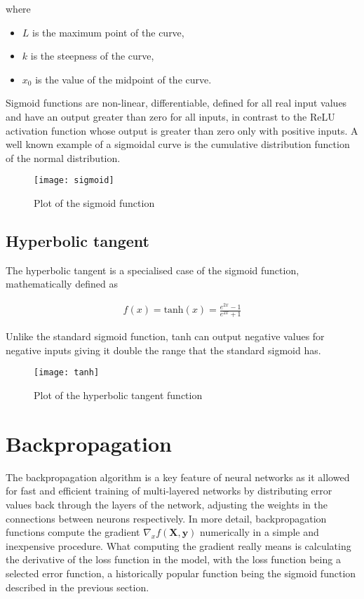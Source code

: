 where 
\begin{itemize}[nosep]
    \item[] $L$ is the maximum point of the curve,
    \item[] $k$ is the steepness of the curve,
    \item[] $x_0$ is the value of the midpoint of the curve. 
\end{itemize}

Sigmoid functions are non-linear, differentiable, defined for all real input values and have an output greater than zero for all inputs, in contrast to the ReLU activation function whose output is greater than zero only with positive inputs. A well known example of a sigmoidal curve is the cumulative distribution function of the normal distribution.

\begin{figure}[H]
    \centering
    \texttt{[image: sigmoid]}
    \caption{Plot of the sigmoid function}
    \label{tab:sigmoid}
\end{figure}

\subsection{Hyperbolic tangent}
The hyperbolic tangent is a specialised case of the sigmoid function, mathematically defined as 

\begin{align}
    f(x) = \text{tanh}(x) = \frac{e^{2x} - 1}{e^{2x} + 1}
\end{align}

Unlike the standard sigmoid function, tanh can output negative values for negative inputs giving it double the range that the standard sigmoid has.

\begin{figure}[H]
    \centering
    \texttt{[image: tanh]}
    \caption{Plot of the hyperbolic tangent function}
    \label{tab:tanh}
\end{figure}

\section{Backpropagation}
The backpropagation algorithm is a key feature of neural networks as it allowed for fast and efficient training of multi-layered networks by distributing error values back through the layers of the network, adjusting the weights in the connections between neurons respectively. In more detail, backpropagation functions compute the gradient $\nabla_{x}f(\mathbf{X}, \mathbf{y})$ numerically in a simple and inexpensive procedure. What computing the gradient really means is calculating the derivative of the loss function in the model, with the loss function being a selected error function, a historically popular function being the sigmoid function described in the previous section.

